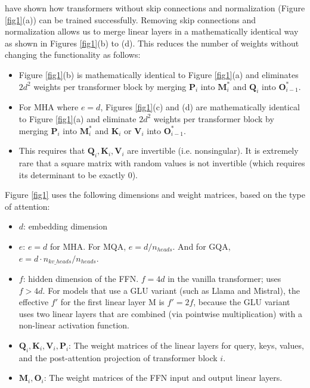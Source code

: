 \documentclass{article}
\newcommand{\mat}[1]{\mathbf{#1}}  %
\def\Q{\mat{Q}_i}
\def\K{\mat{K}_i}
\def\V{\mat{V}_i}
\def\P{\mat{P}_i}
\def\O{\mat{O}_{i-1}}
\def\M{\mat{M}_i}
\begin{document}
\citet{skipless} have shown how transformers without skip connections and normalization (Figure \ref{fig1}(a)) can be trained successfully. Removing skip connections and normalization allows us to merge linear layers in a mathematically identical way as shown in Figures \ref{fig1}(b) to (d). This reduces the number of weights without changing the functionality as follows:
\begin{itemize}[topsep=-1pt, itemsep=-1pt]
  \item Figure \ref{fig1}(b) is mathematically identical to Figure \ref{fig1}(a) and eliminates $2d^2$ weights per transformer block by merging $\P$ into $\M^*$ and $\Q$ into $\O^*$.
  \item For MHA where $e = d$, Figures \ref{fig1}(c) and (d) are mathematically identical to Figure \ref{fig1}(a) and eliminate $2d^2$ weights per transformer block by merging $\P$ into $\M^*$ and $\K$ or $\V$ into $\O^*$.
  \item This requires that $\Q, \K, \V$ are invertible (i.e. nonsingular). It is extremely rare that a square matrix with random values is not invertible \cite{invertible} (which requires its determinant to be exactly 0).
\end{itemize}

Figure \ref{fig1} uses the following dimensions and weight matrices, based on the type of attention:
\begin{itemize}[topsep=-1pt, itemsep=-1pt]
  \item $d$: embedding dimension
  \item $e$: $e = d$ for MHA. For MQA, $e = d / n_{heads}$. And for GQA, $e = d \cdot n_{kv\_heads} / n_{heads}$.
  \item $f$: hidden dimension of the FFN. $f = 4d$ in the vanilla transformer; \citet{MQA} uses $f > 4d$. For models that use a GLU variant \cite{GLU} (such as Llama and Mistral), the effective $f'$ for the first linear layer M is $f' = 2f$, because the GLU variant uses two linear layers that are combined (via pointwise multiplication) with a non-linear activation function.
  \item $\Q, \K, \V, \P$: The weight matrices of the linear layers for query, keys, values, and the post-attention projection of transformer block $i$.
  \item $\M, \mat{O}_i$: The weight matrices of the FFN input and output linear layers.
\end{itemize}
\end{document}

